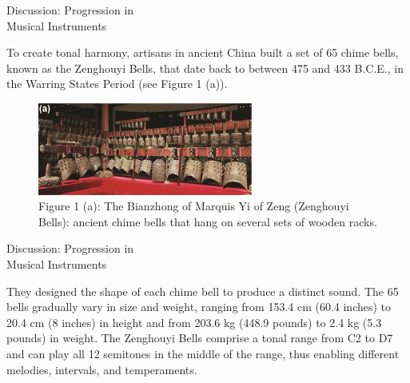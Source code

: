 \documentclass[aspectratio=169,xcolor=dvipsnames]{beamer}
\begin{document}

\begin{frame}{Discussion: Progression in \\Musical Instruments}
    \begin{scriptsize}
        To create tonal harmony, artisans in ancient China built a set of 65 chime bells, known as the Zenghouyi Bells, that date back to between 475 and 433 B.C.E., in the Warring States Period (see Figure 1 (a)).
    \end{scriptsize}
    \begin{figure}[!ht]
\label{musical instrument}
 \centering
 \includegraphics[width=200pt]{images/figure_a.jpeg}
 \caption{Figure 1 (a): The Bianzhong of Marquis Yi of Zeng (Zenghouyi Bells): ancient chime bells that hang on several sets of wooden racks.}
 \end{figure}
\end{frame}

\begin{frame}{Discussion: Progression in \\Musical Instruments}
\begin{small}
    They designed the shape of each chime bell to produce a distinct sound. The 65 bells gradually vary in size and weight, ranging from 153.4 cm (60.4 inches) to 20.4 cm (8 inches) in height and from 203.6 kg (448.9 pounds) to 2.4 kg (5.3 pounds) in weight. The Zenghouyi Bells comprise a tonal range from C2 to D7 and can play all 12 semitones in the middle of the range, thus enabling different melodies, intervals, and temperaments. 
\end{small}
\end{frame}
\end{document}

